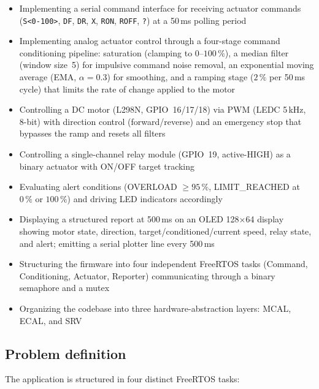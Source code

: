 \begin{itemize}
  \item Implementing a serial command interface for receiving actuator commands
    (\texttt{S<0-100>}, \texttt{DF}, \texttt{DR}, \texttt{X}, \texttt{RON},
    \texttt{ROFF}, \texttt{?}) at a 50\,ms polling period
  \item Implementing analog actuator control through a four-stage command conditioning
    pipeline: saturation (clamping to $0$--$100\,\%$), a median filter (window size~5)
    for impulsive command noise removal, an exponential moving average
    (EMA, $\alpha = 0.3$) for smoothing, and a ramping stage ($2\,\%$ per 50\,ms cycle)
    that limits the rate of change applied to the motor
  \item Controlling a DC motor (L298N, GPIO~16/17/18) via PWM (LEDC 5\,kHz, 8-bit)
    with direction control (forward/reverse) and an emergency stop that bypasses the
    ramp and resets all filters
  \item Controlling a single-channel relay module (GPIO~19, active-HIGH) as a binary
    actuator with ON/OFF target tracking
  \item Evaluating alert conditions (OVERLOAD $\geq 95\,\%$, LIMIT\_REACHED at
    $0\,\%$ or $100\,\%$) and driving LED indicators accordingly
  \item Displaying a structured report at 500\,ms on an OLED 128$\times$64 display
    showing motor state, direction, target/conditioned/current speed, relay state,
    and alert; emitting a serial plotter line every 500\,ms
  \item Structuring the firmware into four independent FreeRTOS tasks (Command,
    Conditioning, Actuator, Reporter) communicating through a binary semaphore and a mutex
  \item Organizing the codebase into three hardware-abstraction layers: MCAL, ECAL,
    and SRV
\end{itemize}

\subsection{Problem definition}

The application is structured in four distinct FreeRTOS tasks:


